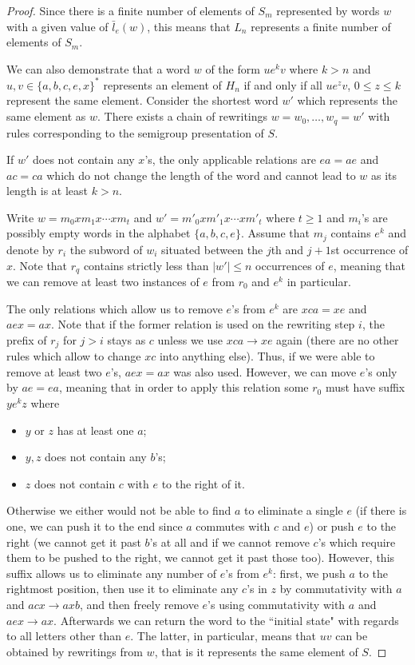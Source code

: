 \documentclass{article}
\theoremstyle{definition}
\begin{document}
\begin{proof}
Since there is a finite number of elements of $S_m$ represented by words $w$ with a given value of $\bar{l}_e(w)$, this means that $L_n$ represents a finite number of elements of $S_m$. 

We can also demonstrate that a word  $w$ of the form $u e^k v$ where $k > n$ and $u,v \in \{a,b,c,e,x\}^*$ represents an element of $H_n$ if and only if all $u e^z v$, $0 \le z \le k$ represent the same element. Consider the shortest word $w'$ which represents the same element as $w$. There exists a chain of rewritings $w = w_0, \ldots, w_q = w'$ with rules corresponding to the semigroup presentation of $S$.

If $w'$ does not contain any $x$'s, the only applicable relations are $ea = ae$ and $ac = ca$ which do not change the length of the word and cannot lead to $w$ as its length is at least $k>n$.

Write $w = m_0 x m_1 x \cdots x m_t$ and $w' = m'_0 x m'_1 x \cdots x m'_t $ where $t\ge 1$ and $m_i$'s are possibly empty words in the alphabet $\{a,b,c,e\}$. Assume that $m_j$ contains $e^k$ and denote by $r_i$ the subword of $w_i$ situated between the $j$th and $j+1$st occurrence of $x$. Note that $r_q$ contains strictly less than $|w'| \le n$ occurrences of $e$, meaning that we can remove at least two instances of $e$ from $r_0$ and $e^k$ in particular. 

The only relations which allow us to remove $e$'s from $e^k$ are $xca = xe$ and $aex = ax$.  Note that if the former relation is used on the rewriting step $i$, the prefix of $r_j$ for $j > i$ stays as $c$ unless we use $xca \rightarrow xe$ again (there are no other rules which allow to change $xc$ into anything else). Thus, if we were able to remove at least two $e$'s, $aex = ax$ was also used. However, we can move $e$'s  only by $ae = ea$, meaning that in order to apply this relation some $r_0$ must have suffix $y e^k z$ where

\begin{itemize}
\item $y$ or $z$ has at least one $a$;
\item $y, z$ does not contain any $b$'s;
\item $z$ does not contain $c$ with $e$ to the right of it.
\end{itemize}

Otherwise we either would not be able to find $a$ to eliminate a single $e$ (if there is one, we can push it to the end since $a$ commutes with $c$ and $e$) or push $e$ to the right (we cannot get it past $b$'s at all and if we cannot remove $c$'s which require them to be pushed to the right, we cannot get it past those too). However, this suffix allows us to eliminate any number of $e$'s from $e^k$: first, we push $a$ to the rightmost position, then use it to eliminate any $c$'s in $z$ by commutativity with $a$ and $acx \rightarrow axb$, and then freely remove $e$'s using commutativity with $a$ and $aex \rightarrow ax$. Afterwards we can return the word to the ``initial state" with regards to all letters other than $e$. The latter, in particular, means that $uv$ can be obtained by rewritings from $w$, that is it represents the same element of $S$.


\end{proof}
\end{document}
